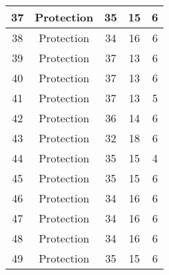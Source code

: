\documentclass[results.tex]{subfiles}
\begin{document}
\begin{center}
\begin{tabular}{| c || c | c | c | c |}
            \hline
            37                      & Protection                   & 35                     & 15                      & 6                    \\
            \hline
            38                      & Protection                   & 34                     & 16                      & 6                    \\
            \hline
            39                      & Protection                   & 37                     & 13                      & 6                    \\
            \hline
            40                      & Protection                   & 37                     & 13                      & 6                    \\
            \hline
            41                      & Protection                   & 37                     & 13                      & 5                    \\
            \hline
            42                      & Protection                   & 36                     & 14                      & 6                    \\
            \hline
            43                      & Protection                   & 32                     & 18                      & 6                    \\
            \hline
            44                      & Protection                   & 35                     & 15                      & 4                    \\
            \hline
            45                      & Protection                   & 35                     & 15                      & 6                    \\
            \hline
            46                      & Protection                   & 34                     & 16                      & 6                    \\
            \hline
            47                      & Protection                   & 34                     & 16                      & 6                    \\
            \hline
            48                      & Protection                   & 34                     & 16                      & 6                    \\
            \hline
            49                      & Protection                   & 35                     & 15                      & 6                    \\
            \hline
        \end{tabular}
    \end{center}
\end{document}
